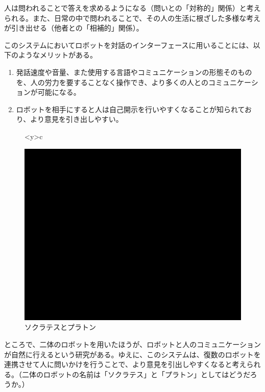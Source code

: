 \documentclass[b5j,twoside,twocolumn]{utarticle}
\begin{document}
人は問われることで答えを求めるようになる（問いとの「対称的」関係）と考えられる。また、日常の中で問われることで、その人の生活に根ざした多様な考えが引き出せる（他者との「相補的」関係）。


このシステムにおいてロボットを対話のインターフェースに用いることには、以下のようなメリットがある。
\begin{enumerate}
\renewcommand{\labelenumi}{\pbox<y>{(\arabic{enumi})}}
\item 発話速度や音量、また使用する言語やコミュニケーションの形態そのものを、人の労力を要することなく操作でき、より多くの人とのコミュニケーションが可能になる。
\item ロボットを相手にすると人は自己開示を行いやすくなることが知られており、より意見を引き出しやすい。
\end{enumerate}

\begin{figure}[h]
\centering
\begin{tabular}<y>{c}
\begin{minipage}[c]{0.65\hsize}
\centering
\includegraphics[scale=0.5]{system1}
\caption{ソクラテスとプラトン}
\end{minipage}
\end{tabular}
\end{figure}

ところで、二体のロボットを用いたほうが、ロボットと人のコミュニケーションが自然に行えるという研究がある。ゆえに、このシステムは、復数のロボットを連携させて人に問いかけを行うことで、より意見を引出しやすくなると考えられる。（二体のロボットの名前は「ソクラテス」と「プラトン」としてはどうだろうか。）
\end{document}
